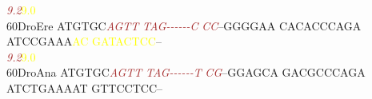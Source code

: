 \documentclass[11pt,twoside,reqno,a4paper]{article}
\begin{document}
{\hspace*{4\charwidth}\hspace*{7\charwidth}\hspace*{6\charwidth}\textit{\textcolor{Brown}{9.2}}\hspace*{1\charwidth}\hspace*{1\charwidth}\hspace*{1\charwidth}\hspace*{1\charwidth}\hspace*{39\charwidth}\textcolor{Yellow}{9.0}\hspace*{1\charwidth}\hspace*{1\charwidth}\\
60\hspace*{2\charwidth}DroEre	ATGTGC\textit{\textcolor{Brown}{A}}\textit{\textcolor{Brown}{G}}\textit{\textcolor{Brown}{T}}\textit{\textcolor{Brown}{T}}	\textit{\textcolor{Brown}{T}}\textit{\textcolor{Brown}{A}}\textit{\textcolor{Brown}{G}}\textit{\textcolor{Brown}{-}}\textit{\textcolor{Brown}{-}}\textit{\textcolor{Brown}{-}}\textit{\textcolor{Brown}{-}}\textit{\textcolor{Brown}{-}}\textit{\textcolor{Brown}{-}}\textit{\textcolor{Brown}{C}}	\textit{\textcolor{Brown}{C}}\textit{\textcolor{Brown}{C}}--GGGGAA	CACACCCAGA	ATCCGAAA\textcolor{Yellow}{A}\textcolor{Yellow}{C}	\textcolor{Yellow}{G}\textcolor{Yellow}{A}\textcolor{Yellow}{T}\textcolor{Yellow}{A}\textcolor{Yellow}{C}\textcolor{Yellow}{T}\textcolor{Yellow}{C}\textcolor{Yellow}{C}--	\\
\hspace*{4\charwidth}\hspace*{7\charwidth}\hspace*{6\charwidth}\textit{\textcolor{Brown}{9.2}}\hspace*{1\charwidth}\hspace*{1\charwidth}\hspace*{1\charwidth}\hspace*{1\charwidth}\hspace*{39\charwidth}\textcolor{Yellow}{9.0}\hspace*{1\charwidth}\hspace*{1\charwidth}\\
60\hspace*{2\charwidth}DroAna	ATGTGC\textit{\textcolor{Brown}{A}}\textit{\textcolor{Brown}{G}}\textit{\textcolor{Brown}{T}}\textit{\textcolor{Brown}{T}}	\textit{\textcolor{Brown}{T}}\textit{\textcolor{Brown}{A}}\textit{\textcolor{Brown}{G}}\textit{\textcolor{Brown}{-}}\textit{\textcolor{Brown}{-}}\textit{\textcolor{Brown}{-}}\textit{\textcolor{Brown}{-}}\textit{\textcolor{Brown}{-}}\textit{\textcolor{Brown}{-}}\textit{\textcolor{Brown}{T}}	\textit{\textcolor{Brown}{C}}\textit{\textcolor{Brown}{G}}--GGAGCA	GACGCCCAGA	ATCTGAAAAT	GTTCCTCC--	\\
}
\end{document}
